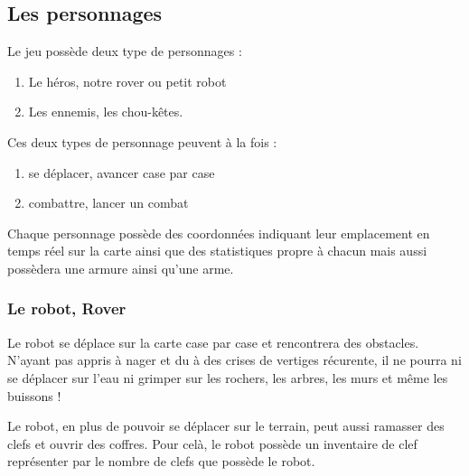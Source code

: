 \documentclass[a4paper 12pts]{article}
\begin{document}
\subsection{Les personnages}

\vspace{1cm}


Le jeu possède deux type de personnages : 

\vspace{0.5cm}

\begin{enumerate}
	\item Le héros, notre rover ou petit robot
	\item Les ennemis, les chou-kêtes.
\end{enumerate}

\vspace{0.5cm}

Ces deux types de personnage peuvent à la fois :

\vspace{0.5cm}

\begin{enumerate}
	\item se déplacer, avancer case par case 
	\item combattre, lancer un combat
\end{enumerate}

\vspace{0.5cm}

Chaque personnage possède des coordonnées indiquant leur emplacement en temps réel sur la carte ainsi que des statistiques propre à chacun mais aussi possèdera une armure ainsi qu'une arme.

\newpage
\subsubsection{Le robot, Rover}
\vspace{1cm}

Le robot se déplace sur la carte case par case et rencontrera des obstacles.
N'ayant pas appris à nager et du à des crises de vertiges récurente, il ne pourra ni se déplacer sur l'eau ni grimper sur les rochers,
les arbres, les murs et même les buissons !

Le robot, en plus de pouvoir se déplacer sur le terrain, peut aussi ramasser des clefs et ouvrir des coffres.
Pour celà, le robot possède un inventaire de clef représenter par le nombre de clefs que possède le robot.\\
\end{document}
